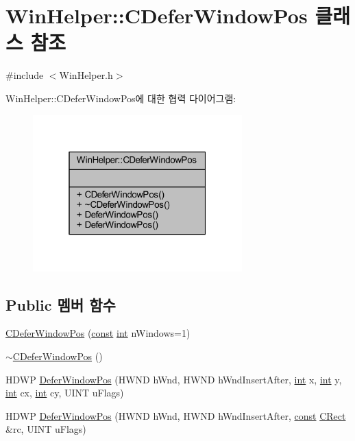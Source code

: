 \hypertarget{class_win_helper_1_1_c_defer_window_pos}{}\section{Win\+Helper\+:\+:C\+Defer\+Window\+Pos 클래스 참조}
\label{class_win_helper_1_1_c_defer_window_pos}


{\ttfamily \#include $<$Win\+Helper.\+h$>$}



Win\+Helper\+:\+:C\+Defer\+Window\+Pos에 대한 협력 다이어그램\+:\nopagebreak
\begin{figure}[H]
\begin{center}
\leavevmode
\includegraphics[width=229pt]{class_win_helper_1_1_c_defer_window_pos__coll__graph}
\end{center}
\end{figure}
\subsection*{Public 멤버 함수}
\begin{DoxyCompactItemize}
\item 
\mbox{\hyperlink{class_win_helper_1_1_c_defer_window_pos_ac98b161abd5044c2a2e1e8b8efa0744f}{C\+Defer\+Window\+Pos}} (\mbox{\hyperlink{getopt1_8c_a2c212835823e3c54a8ab6d95c652660e}{const}} \mbox{\hyperlink{_util_8cpp_a0ef32aa8672df19503a49fab2d0c8071}{int}} n\+Windows=1)
\item 
\mbox{\hyperlink{class_win_helper_1_1_c_defer_window_pos_a00fc71f25d7b35c3126950290fa205fe}{$\sim$\+C\+Defer\+Window\+Pos}} ()
\item 
H\+D\+WP \mbox{\hyperlink{class_win_helper_1_1_c_defer_window_pos_a50e9a5dfc382996381a506d66f94efd6}{Defer\+Window\+Pos}} (H\+W\+ND h\+Wnd, H\+W\+ND h\+Wnd\+Insert\+After, \mbox{\hyperlink{_util_8cpp_a0ef32aa8672df19503a49fab2d0c8071}{int}} x, \mbox{\hyperlink{_util_8cpp_a0ef32aa8672df19503a49fab2d0c8071}{int}} y, \mbox{\hyperlink{_util_8cpp_a0ef32aa8672df19503a49fab2d0c8071}{int}} cx, \mbox{\hyperlink{_util_8cpp_a0ef32aa8672df19503a49fab2d0c8071}{int}} cy, U\+I\+NT u\+Flags)
\item 
H\+D\+WP \mbox{\hyperlink{class_win_helper_1_1_c_defer_window_pos_aeba6047e5182577c14bfe4729a602ca9}{Defer\+Window\+Pos}} (H\+W\+ND h\+Wnd, H\+W\+ND h\+Wnd\+Insert\+After, \mbox{\hyperlink{getopt1_8c_a2c212835823e3c54a8ab6d95c652660e}{const}} \mbox{\hyperlink{class_win_helper_1_1_c_rect}{C\+Rect}} \&rc, U\+I\+NT u\+Flags)
\end{DoxyCompactItemize}


